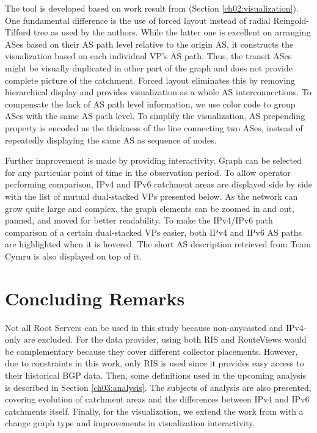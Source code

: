 The tool is developed based on work result from \cite{github-anycast} (Section \ref{ch02:visualization}). One fundamental difference is the use of forced layout instead of radial Reingold-Tilford tree as used by the authors. While the latter one is excellent on arranging ASes based on their AS path level relative to the origin AS, it constructs the visualization based on each individual VP's AS path. Thus, the transit ASes might be visually duplicated in other part of the graph and does not provide complete picture of the catchment. Forced layout eliminates this by removing hierarchical display and provides visualization as a whole AS interconnections. To compensate the lack of AS path level information, we use color code to group ASes with the same AS path level. To simplify the visualization, AS prepending property is encoded as the thickness of the line connecting two ASes, instead of repeatedly displaying the same AS as sequence of nodes.

Further improvement is made by providing interactivity. Graph can be selected for any particular point of time in the observation period. To allow operator performing comparison, IPv4 and IPv6 catchment areas are displayed side by side with the list of mutual dual-stacked VPs presented below. As the network can grow quite large and complex, the graph elements can be zoomed in and out, panned, and moved for better readability. To make the IPv4/IPv6 path comparison of a certain dual-stacked VPs easier, both IPv4 and IPv6 AS paths are highlighted when it is hovered. The short AS description retrieved from Team Cymru is also displayed on top of it.

\section{Concluding Remarks}
\label{ch03:concluding}
Not all Root Servers can be used in this study because non-anycasted and IPv4-only are excluded. For the data provider, using both RIS and RouteViews would be complementary because they cover different collector placements. However, due to constraints in this work, only RIS is used since it provides easy access to their historical BGP data. Then, some definitions used in the upcoming analysis is described in Section \ref{ch03:analysis}. The subjects of analysis are also presented, covering evolution of catchment areas and the differences between IPv4 and IPv6 catchments itself. Finally, for the visualization, we extend the work from \cite{github-anycast} with a change graph type and improvements in visualization interactivity.